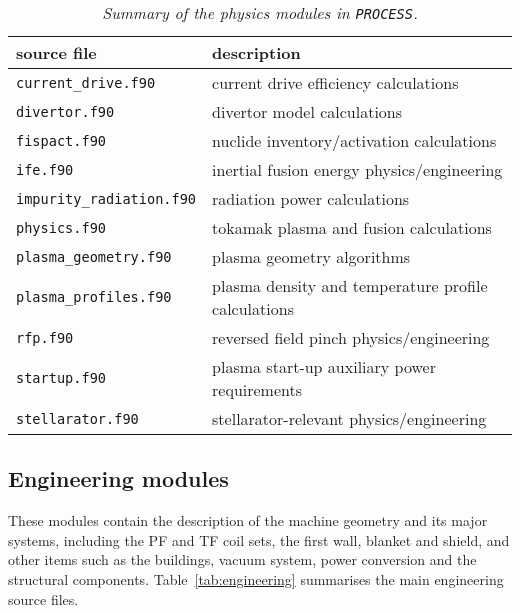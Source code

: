 \documentclass[11pt,a4paper]{report}
\newcommand{\process}{\mbox{\texttt{PROCESS}}}
\begin{document}
\begin{table}[tbph]
\begin{center}

\begin{tabular}{||l||l||} \hline
source file   & description \\ \hline
\texttt{current\_drive.f90} & current drive efficiency calculations \\
\texttt{divertor.f90} & divertor model calculations\\
\texttt{fispact.f90} & nuclide inventory/activation calculations \\
\texttt{ife.f90} & inertial fusion energy physics/engineering \\
\texttt{impurity\_radiation.f90} & radiation power calculations \\
\texttt{physics.f90} & tokamak plasma and fusion calculations \\
\texttt{plasma\_geometry.f90} & plasma geometry algorithms \\
\texttt{plasma\_profiles.f90} & plasma density and temperature profile calculations \\
\texttt{rfp.f90} & reversed field pinch physics/engineering \\
\texttt{startup.f90} & plasma start-up auxiliary power requirements \\
\texttt{stellarator.f90 } & stellarator-relevant physics/engineering \\
\hline
\end{tabular}
\end{center}
\caption[Summary of physics modules]
{\label{tab:physics}
  \textit{Summary of the physics modules in \process.}
}
\end{table}

\subsection{Engineering modules}

These modules contain the description of the machine geometry and its major
systems, including the PF and TF coil sets, the first wall, blanket and
shield, and other items such as the buildings, vacuum system, power conversion
and the structural components.  Table~\ref{tab:engineering} summarises the main
engineering source files.
\end{document}
